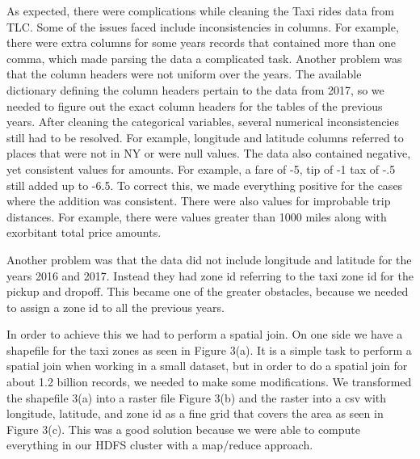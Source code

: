 \documentclass{sigkddExp}
\begin{document}
As expected, there were complications while cleaning the Taxi rides data from TLC. Some of the issues faced include inconsistencies in columns. For example, there were extra columns for some years records that contained more than one comma, which made parsing the data a complicated task. 
Another problem was that the column headers were not uniform over the years. The available dictionary defining the column headers pertain to the data from 2017, so we needed to figure out the exact column headers for the tables of the previous years.
After cleaning the categorical variables, several numerical inconsistencies still had to be resolved. For example, longitude and latitude columns referred to places that were not in NY or were null values. The data also contained negative, yet consistent values for amounts. For example, a fare of -5, tip of -1 tax of -.5 still added up to -6.5. To correct this, we made everything positive for the cases where the addition was consistent. There were also values for improbable trip distances. For example, there were values greater than 1000 miles along with exorbitant total price amounts.

Another problem was that the data did not include longitude and latitude for the years 2016 and 2017. Instead they had zone id referring to the taxi zone id for the pickup and dropoff. This became one of the greater obstacles, because we needed to assign a zone id to all the previous years. 

In order to achieve this we had to perform a spatial join. On one side we have a shapefile for the taxi zones as seen in Figure 3(a). It is a simple task to perform a spatial join when working in a small dataset, but in order to do a spatial join for about 1.2 billion records, we needed to make some modifications. We transformed the shapefile 3(a) into a raster file Figure 3(b) and the raster into a csv with longitude, latitude, and zone id as a fine grid that covers the area as seen in Figure 3(c). This was a good solution because we were able to compute everything in our HDFS cluster with a map/reduce approach.
\end{document}

